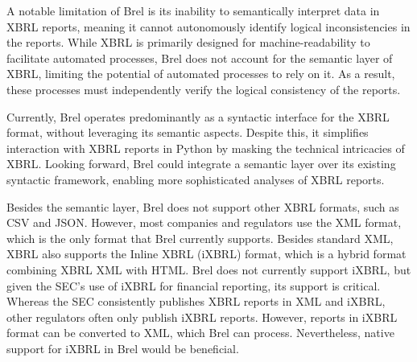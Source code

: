 A notable limitation of Brel is its inability to semantically interpret data in XBRL reports,
meaning it cannot autonomously identify logical inconsistencies in the reports.
While XBRL is primarily designed for machine-readability to facilitate automated processes,
Brel does not account for the semantic layer of XBRL, limiting the potential of automated processes to rely on it.
As a result, these processes must independently verify the logical consistency of the reports.

Currently, Brel operates predominantly as a syntactic interface for the XBRL format, without leveraging its semantic aspects.
Despite this, it simplifies interaction with XBRL reports in Python by masking the technical intricacies of XBRL.
Looking forward, Brel could integrate a semantic layer over its existing syntactic framework, enabling more sophisticated analyses of XBRL reports.

Besides the semantic layer, Brel does not support other XBRL formats, such as CSV and JSON.
However, most companies and regulators use the XML format, which is the only format that Brel currently supports.
Besides standard XML, XBRL also supports the Inline XBRL (iXBRL) format, 
which is a hybrid format combining XBRL XML with HTML.
Brel does not currently support iXBRL, but given the SEC's use of iXBRL for financial reporting, its support is critical.
Whereas the SEC consistently publishes XBRL reports in XML and iXBRL, other regulators often only publish iXBRL reports.
However, reports in iXBRL format can be converted to XML, which Brel can process.
Nevertheless, native support for iXBRL in Brel would be beneficial.

